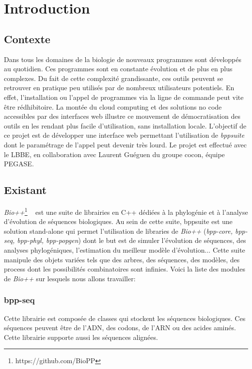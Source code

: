 \section{Introduction}

\subsection{Contexte}
	Dans tous les domaines de la biologie de nouveaux programmes sont développés au quotidien. Ces programmes sont en constante évolution et de plus en plus complexes. Du fait de cette complexité grandissante, ces outils peuvent se retrouver en pratique peu utilisés par de nombreux utilisateurs potentiels. En effet, l'installation ou l'appel de programmes via la ligne de commande peut vite être rédhibitoire.
	La montée du cloud computing et des solutions no code accessibles par des interfaces web illustre ce mouvement de démocratisation des outils en les rendant plus facile d'utilisation, sans installation locale.
	L'objectif de ce projet est de développer une interface web permettant l'utilisation de \textit{bppsuite} dont le paramétrage de l'appel peut devenir très lourd.
	Le projet est effectué avec le LBBE, en collaboration avec Laurent Guéguen du groupe cocon, équipe PEGASE.
	
	
\subsection{Existant}
	\textit{Bio++}\footnote{https://github.com/BioPP} ~\cite{Guéguen} est une suite de librairies en C++ dédiées à la phylogénie et à l'analyse d'évolution de séquences biologiques. Au sein de cette suite, bppsuite est une solution stand-alone qui permet l'utilisation de libraries de \textit{Bio++} (\textit{bpp-core, bpp-seq, bpp-phyl, bpp-popgen}) dont le but est de simuler l'évolution de séquences, des analyses phylogéniques, l'estimation du meilleur modèle d'évolution... Cette suite manipule des objets variées tels que des arbres, des séquences, des modèles, des process dont les possibilités combinatoires sont infinies. Voici la liste des modules de \textit{Bio++} sur lesquels nous allons travailler:
	
	\subsubsection*{bpp-seq}
	Cette librairie est composée de classes qui stockent les séquences biologiques. Ces séquences peuvent être de l'ADN, des codons, de l'ARN ou des acides aminés. Cette librairie supporte aussi les séquences alignées.
	
